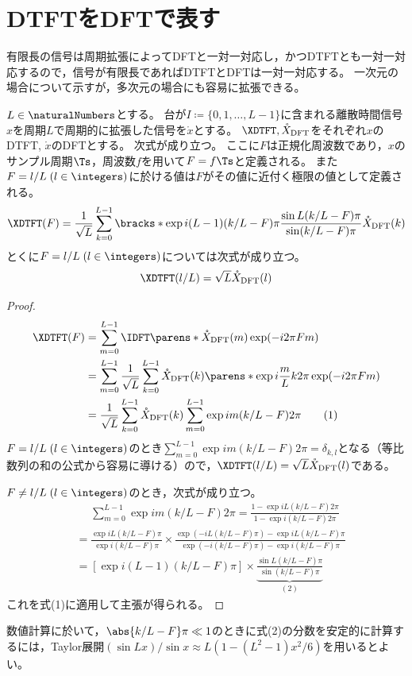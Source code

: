     \section{DTFTをDFTで表す}
        \newcommand*{\XprdDFT}{\mathring{X}_\mathrm{DFT}}
        有限長の信号は周期拡張によってDFTと一対一対応し，かつDTFTとも一対一対応するので，信号が有限長であればDTFTとDFTは一対一対応する。
        一次元の場合について示すが，多次元の場合にも容易に拡張できる。
        \begin{shadebox}
            $L\in\naturalNumbers$とする。
            台が$I\coloneq\{0,1,\dots,L-1\}$に含まれる離散時間信号$x$を周期$L$で周期的に拡張した信号を$\mathring{x}$とする。
            $\XDTFT,\XprdDFT$をそれぞれ$x$のDTFT, $\mathring{x}$のDFTとする。
            次式が成り立つ。
            ここに$F$は正規化周波数であり，$x$のサンプル周期$\Ts$，周波数$f$を用いて$F = f\Ts$と定義される。
            また$F = l/L\;(l\in\integers)$に於ける値は$F$がその値に近付く極限の値として定義される。
            \[ \XDTFT(F) = \frac{1}{\sqrt{L}}\sum_{k=0}^{L-1}\bracks*{\exp i(L-1)(k/L-F)\pi}\frac{\sin L(k/L-F)\pi}{\sin(k/L-F)\pi}\XprdDFT(k) \]
            とくに$F = l/L\;(l\in\integers)$については次式が成り立つ。
            \[ \XDTFT(l/L) = \sqrt{L}\XprdDFT(l) \]
        \end{shadebox}
        \begin{proof}
            \begin{align*}
                \XDTFT(F) &= \sum_{m=0}^{L-1}\IDFT\parens*{\XprdDFT}(m)\exp(-i 2\pi F m) \\
                &= \sum_{m=0}^{L-1}\frac{1}{\sqrt{L}}\sum_{k=0}^{L-1}\XprdDFT(k)\parens*{\exp i\frac{m}{L}k 2\pi}\exp(-i 2\pi F m) \\
                &= \frac{1}{\sqrt{L}}\sum_{k=0}^{L-1}\XprdDFT(k)\sum_{m=0}^{L-1}\exp i m(k/L-F)2\pi \tag{1}
            \end{align*}
            $F = l/L\;(l\in\integers)$のとき$\sum_{m=0}^{L-1}\exp i m(k/L-F)2\pi = \delta_{k,l}$となる（等比数列の和の公式から容易に導ける）ので，$\XDTFT(l/L) = \sqrt{L}\XprdDFT(l)$である。
            \par
            $F \neq l/L\;(l\in\integers)$のとき，次式が成り立つ。
            \begin{align*}
                &\phantom{=} \sum_{m=0}^{L-1}\exp i m(k/L-F)2\pi = \frac{1 - \exp i L(k/L-F)2\pi}{1 - \exp i(k/L-F)2\pi} \\
                &= \frac{\exp iL(k/L-F)\pi}{\exp i(k/L-F)\pi}\times\frac{\exp(-i L(k/L-F)\pi) - \exp i L(k/L-F)\pi}{\exp(-i(k/L-F)\pi) - \exp i(k/L-F)\pi} \\
                &= [\exp i(L-1)(k/L-F)\pi]\times\underbrace{\frac{\sin L(k/L-F)\pi}{\sin(k/L-F)\pi}}_{(2)}
            \end{align*}
            これを式(1)に適用して主張が得られる。
        \end{proof}
        数値計算に於いて，$\abs{k/L-F}\pi\ll 1$のときに式(2)の分数を安定的に計算するには，Taylor展開$(\sin Lx)/\sin x \approx L(1-(L^2-1)x^2/6)$を用いるとよい。
